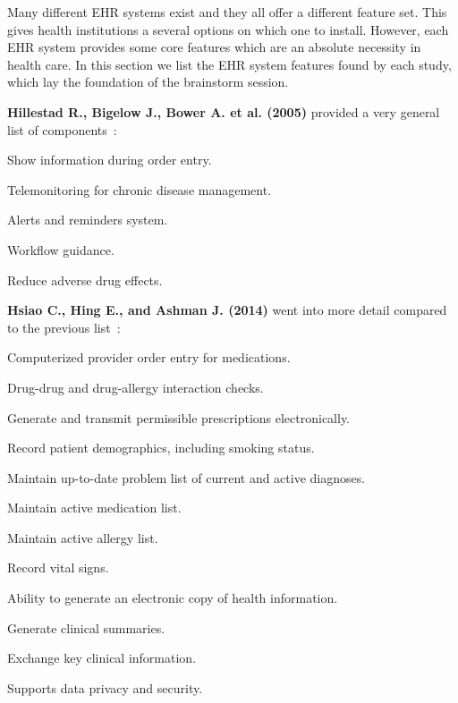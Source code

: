        Many different EHR systems exist and they all offer a different feature set. This gives health institutions a several options on which one to install. However, each EHR system provides some core features which are an absolute necessity in health care. In this section we list the EHR system features found by each study, which lay the foundation of the brainstorm session.\bigskip

        \noindent \textbf{Hillestad R., Bigelow J., Bower A. et al. (2005)} provided a very general list of components~\cite{Hillestad2005}:
        \vspace{-\topsep}
        \begin{multicols}{2}
            \begin{myitemize}
                \item Show information during order entry.
                \item Telemonitoring for chronic disease management.
                \item Alerts and reminders system.
                \item Workflow guidance.
                \item Reduce adverse drug effects.
            \end{myitemize}
        \end{multicols}

        \noindent \textbf{Hsiao C., Hing E., and Ashman J. (2014)} went into more detail compared to the previous list~\cite{Hsiao2014}:
        \vspace{-0.5\topsep}
        \begin{myitemize}
            \item Computerized provider order entry for medications.
            \item Drug-drug and drug-allergy interaction checks.
            \item Generate and transmit permissible prescriptions electronically.
            \item Record patient demographics, including smoking status.
            \item Maintain up-to-date problem list of current and active diagnoses.
            \item Maintain active medication list.
            \item Maintain active allergy list.
            \item Record vital signs.
            \item Ability to generate an electronic copy of health information.
            \item Generate clinical summaries.
            \item Exchange key clinical information.
            \item Supports data privacy and security.
        \end{myitemize}

